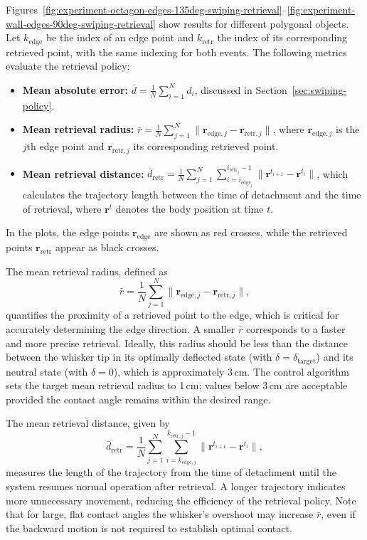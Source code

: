 Figures~\ref{fig:experiment-octagon-edges-135deg-swiping-retrieval}--\ref{fig:experiment-wall-edges-90deg-swiping-retrieval} show results for different polygonal objects.
Let $k_{\mathrm{edge}}$ be the index of an edge point and $k_{\mathrm{retr}}$ the index of its corresponding retrieved point, with the same indexing for both events.
The following metrics evaluate the retrieval policy:
\begin{itemize}
    \item \textbf{Mean absolute error:} $\bar{d} = \frac{1}{N}\sum_{i=1}^{N} d_i$, discussed in Section~\ref{sec:swiping-policy}.
    \item \textbf{Mean retrieval radius:} $\bar{r} = \frac{1}{N}\sum_{j=1}^{N} \|\mathbf{r}_{\mathrm{edge},j} - \mathbf{r}_{\mathrm{retr},j}\|$, where $\mathbf{r}_{\mathrm{edge},j}$ is the $j$th edge point and $\mathbf{r}_{\mathrm{retr},j}$ its corresponding retrieved point.
    \item \textbf{Mean retrieval distance:} $\bar{d}_{\mathrm{retr}} = \frac{1}{N}\sum_{j=1}^{N}\sum_{i=i_{\mathrm{edge}_j}}^{i_{\mathrm{retr}_j}-1} \|\mathbf{r}^{t_{i+1}} - \mathbf{r}^{t_i}\|$, which calculates the trajectory length between the time of detachment and the time of retrieval, where $\mathbf{r}^{t}$ denotes the body position at time $t$.
\end{itemize}
In the plots, the edge points $\mathbf{r}_{\mathrm{edge}}$ are shown as red crosses, while the retrieved points $\mathbf{r}_{\mathrm{retr}}$ appear as black crosses.

The mean retrieval radius, defined as
\[
    \bar{r} = \frac{1}{N}\sum_{j=1}^{N} \|\mathbf{r}_{\mathrm{edge},j} - \mathbf{r}_{\mathrm{retr},j}\|,
\]
quantifies the proximity of a retrieved point to the edge, which is critical for accurately determining the edge direction.
A smaller $\bar{r}$ corresponds to a faster and more precise retrieval.
Ideally, this radius should be less than the distance between the whisker tip in its optimally deflected state (with $\delta=\delta_{\mathrm{target}}$) and its neutral state (with $\delta=0$), which is approximately 3\,cm.
The control algorithm sets the target mean retrieval radius to 1\,cm; values below 3\,cm are acceptable provided the contact angle remains within the desired range.

The mean retrieval distance, given by
\[
    \bar{d}_{\mathrm{retr}} = \frac{1}{N}\sum_{j=1}^{N}\sum_{i=k_{\mathrm{edge},j}}^{k_{\mathrm{retr},j}-1} \|\mathbf{r}^{t_{i+1}} - \mathbf{r}^{t_i}\|,
\]
measures the length of the trajectory from the time of detachment until the system resumes normal operation after retrieval.
A longer trajectory indicates more unnecessary movement, reducing the efficiency of the retrieval policy.
Note that for large, flat contact angles the whisker's overshoot may increase $\bar{r}$, even if the backward motion is not required to establish optimal contact.

